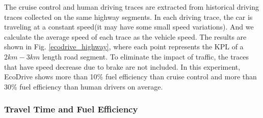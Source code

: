 The cruise control and human driving traces are extracted from 
historical driving traces collected on the same highway segments. 
In each driving trace, the car is traveling at a
constant speed(it may have some small speed variations). And we calculate the average speed of each trace as the vehicle speed.
The results are shown in Fig. \ref{ecodrive_highway}, where
each point represents the KPL of a $2km-3km$ length road segment. 
To eliminate the impact of traffic, the traces that 
have speed decrease due to brake are not included. 
In this experiment, EcoDrive shows more than 10\% fuel efficiency than cruise control
and more than 30\% fuel efficiency than human drivers on average. 



\subsubsection{Travel Time and Fuel Efficiency}


